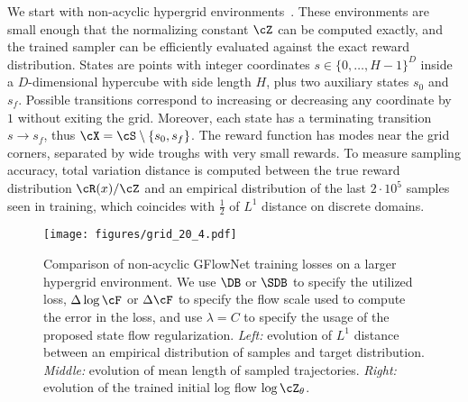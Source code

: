 We start with non-acyclic hypergrid environments~\cite{brunswic2024theory}. These environments are small enough that the normalizing constant $\cZ$ can be computed exactly, and the trained sampler can be efficiently evaluated against the exact reward distribution. States are points with integer coordinates $s \in \{0,\ldots,H-1\}^{D}$ inside a $D$-dimensional hypercube with side length $H$, plus two auxiliary states $s_0$ and $s_f$. Possible transitions correspond to increasing or decreasing any coordinate by $1$ without exiting the grid. Moreover, each state has a terminating transition $s \to s_f$, thus $\cX = \cS \setminus \{s_0, s_f\}$. The reward function has modes near the grid corners, separated by wide troughs with very small rewards. To measure sampling accuracy, total variation distance is computed between the true reward distribution $\cR(x) / \cZ$ and an empirical distribution of the last $2 \cdot 10^5$ samples seen in training, which coincides with $\frac{1}{2}$ of $L^1$ distance on discrete domains.%

\begin{figure*}[!t]

    \centering
    \texttt{[image: figures/grid\_20\_4.pdf]}

    \caption{Comparison of non-acyclic GFlowNet training losses on a larger hypergrid environment. We use $\DB$ or $\SDB$ to specify the utilized loss, $\Delta \log \cF$ or $\Delta \cF$ to specify the flow scale used to compute the error in the loss, and use $\lambda = C$ to specify the usage of the proposed state flow regularization. \textit{Left:} evolution of $L^1$ distance between an empirical distribution of samples and target distribution. \textit{Middle:} evolution of mean length of sampled trajectories. \textit{Right:} evolution of the trained initial log flow $\log \cZ_\theta$. \vspace{-0.05cm}} 
\label{fig:big_grid}
\end{figure*}


